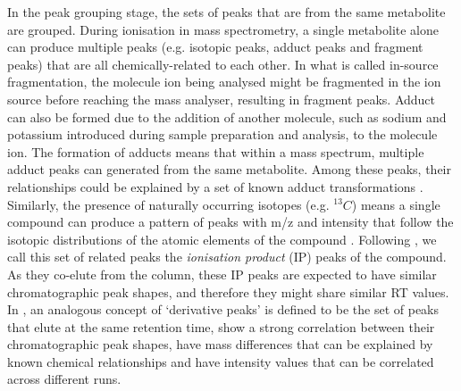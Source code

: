 In the peak grouping stage, the sets of peaks that are from the same metabolite are grouped. During ionisation in mass spectrometry, a single metabolite alone can produce multiple peaks (e.g. isotopic peaks, adduct peaks and fragment peaks) that are all chemically-related to each other. In what is called in-source fragmentation, the molecule ion being analysed might be fragmented in the ion source before reaching the mass analyser, resulting in fragment peaks. Adduct can also be formed due to the addition of another molecule, such as sodium and potassium introduced during sample preparation and analysis, to the molecule ion. The formation of adducts means that within a mass spectrum, multiple adduct peaks can generated from the same metabolite. Among these peaks, their relationships could be explained by a set of known adduct transformations \cite{Keller2008}. Similarly, the presence of naturally occurring isotopes (e.g. $^{13}C$) means a single compound can produce a pattern of peaks with m/z and intensity that follow the isotopic distributions of the atomic elements of the compound \cite{Snider2007}. Following \cite{Lee2013}, we call this set of related peaks the \emph{ionisation product} (IP) peaks of the compound. As they co-elute from the column, these IP peaks are expected to have similar chromatographic peak shapes, and therefore they might share similar RT values. In \cite{Scheltema2009a}, an analogous concept of `derivative peaks' is defined to be the set of peaks that elute at the same retention time, show a strong correlation between their chromatographic peak shapes, have mass differences that can be explained by known chemical relationships and have intensity values that can be correlated across different runs. 

